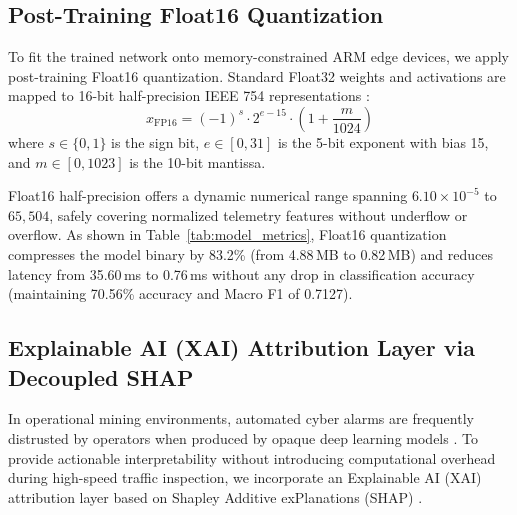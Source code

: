 \documentclass[conference]{IEEEtran}
\begin{document}
\subsection{Post-Training Float16 Quantization}
To fit the trained network onto memory-constrained ARM edge devices, we apply post-training Float16 quantization. Standard Float32 weights and activations are mapped to 16-bit half-precision IEEE 754 representations \cite{jacob2018quantization, micikevicius2018mixed}:
\begin{equation}
x_{\text{FP16}} = (-1)^s \cdot 2^{e - 15} \cdot \left(1 + \frac{m}{1024}\right)
\end{equation}
where $s \in \{0, 1\}$ is the sign bit, $e \in [0, 31]$ is the 5-bit exponent with bias 15, and $m \in [0, 1023]$ is the 10-bit mantissa.

Float16 half-precision offers a dynamic numerical range spanning $6.10 \times 10^{-5}$ to $65,504$, safely covering normalized telemetry features without underflow or overflow. As shown in Table~\ref{tab:model_metrics}, Float16 quantization compresses the model binary by 83.2\% (from 4.88\,MB to 0.82\,MB) and reduces latency from 35.60\,ms to 0.76\,ms without any drop in classification accuracy (maintaining 70.56\% accuracy and Macro F1 of 0.7127).

\subsection{Explainable AI (XAI) Attribution Layer via Decoupled SHAP}
In operational mining environments, automated cyber alarms are frequently distrusted by operators when produced by opaque deep learning models \cite{oyedotun2025towards}. To provide actionable interpretability without introducing computational overhead during high-speed traffic inspection, we incorporate an Explainable AI (XAI) attribution layer based on Shapley Additive exPlanations (SHAP) \cite{lundberg2017unified}. 
\end{document}
